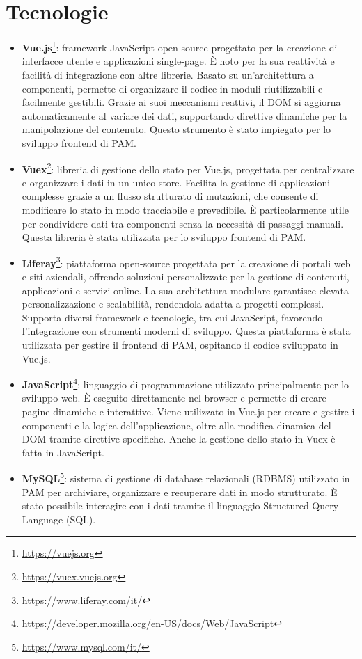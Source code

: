 \section{Tecnologie}
\begin{itemize}
    \item \textbf{Vue.js}\footnote{\url{https://vuejs.org}}: framework JavaScript open-source progettato per la creazione di interfacce utente e applicazioni single-page. È noto per la sua reattività e
    facilità di integrazione con altre librerie. Basato su un’architettura a componenti, permette di organizzare il codice in moduli riutilizzabili e facilmente
    gestibili. Grazie ai suoi meccanismi reattivi, il \ac{DOM} si aggiorna automaticamente al variare dei dati, supportando direttive dinamiche
    per la manipolazione del contenuto. Questo strumento è stato impiegato per lo sviluppo frontend di \ac{PAM}.
    \item \textbf{Vuex}\footnote{\url{https://vuex.vuejs.org}}: libreria di gestione dello stato per Vue.js, progettata per centralizzare e organizzare i dati in un unico store. Facilita la gestione di
    applicazioni complesse grazie a un flusso strutturato di mutazioni, che consente di modificare lo stato in modo tracciabile e prevedibile. È particolarmente utile
    per condividere dati tra componenti senza la necessità di passaggi manuali. Questa libreria è stata utilizzata per lo sviluppo frontend di \ac{PAM}.
    \item \textbf{Liferay}\footnote{\url{https://www.liferay.com/it/}}: piattaforma open-source progettata per la creazione di portali web e siti aziendali, offrendo soluzioni personalizzate per la gestione di
    contenuti, applicazioni e servizi online. La sua architettura modulare garantisce elevata personalizzazione e scalabilità, rendendola adatta a progetti complessi.
    Supporta diversi framework e tecnologie, tra cui JavaScript, favorendo l’integrazione con strumenti moderni di sviluppo. Questa piattaforma è stata utilizzata per
    gestire il frontend di \ac{PAM}, ospitando il codice sviluppato in Vue.js.
    \item \textbf{JavaScript}\footnote{\url{https://developer.mozilla.org/en-US/docs/Web/JavaScript}}: linguaggio di programmazione utilizzato principalmente per lo sviluppo web. È eseguito direttamente nel browser e permette di creare
    pagine dinamiche e interattive. Viene utilizzato in Vue.js per creare e gestire i componenti e la logica dell'applicazione, oltre alla modifica dinamica del
    \ac{DOM} tramite direttive specifiche. Anche la gestione dello stato in Vuex è fatta in JavaScript.
    \item \textbf{MySQL}\footnote{\url{https://www.mysql.com/it/}}: sistema di gestione di database relazionali (RDBMS) utilizzato in \ac{PAM} per archiviare, organizzare e recuperare dati in modo strutturato.
    È stato possibile interagire con i dati tramite il linguaggio Structured Query Language (SQL). 
\end{itemize}